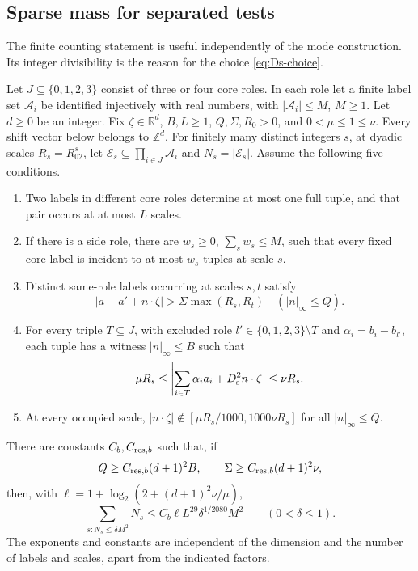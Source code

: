 \subsection{Sparse mass for separated tests}

The finite counting statement is useful independently of the mode
construction.  Its integer divisibility is the reason for the
choice \eqref{eq:Ds-choice}.

\begin{lemma}\label{lem:sparse-b}
Let \(J\subseteq\{0,1,2,3\}\) consist of three or four core roles.
In each role let a finite label set \(\mathcal A_i\) be identified
injectively with real numbers, with \(|\mathcal A_i|\le M\),
\(M\ge1\).  Let \(d\ge0\) be an integer.  Fix
\(\zeta\in\mathbb R^d\), \(B,L\ge1\), \(Q,\Sigma,R_0>0\), and
\(0<\mu\le1\le\nu\).  Every shift vector below belongs to
\(\mathbb Z^d\).  For finitely many distinct integers \(s\), at
dyadic scales \(R_s=R_02^s\), let
\(\mathcal E_s\subseteq\prod_{i\in J}\mathcal A_i\)
and \(N_s=|\mathcal E_s|\).  Assume the following five conditions.
\begin{enumerate}
\item Two labels in different core roles determine at most one full
tuple, and that pair occurs at at most \(L\) scales.
\item If there is a side role, there are \(w_s\ge0\),
\(\sum_s w_s\le M\), such that every fixed core label is incident
to at most \(w_s\) tuples at scale \(s\).
\item Distinct same-role labels occurring at scales \(s,t\) satisfy
\[
 |a-a'+n\cdot\zeta|>\Sigma\max(R_s,R_t)
       \quad(|n|_\infty\le Q).
\]
\item For every triple \(T\subseteq J\), with excluded role
\(l'\in\{0,1,2,3\}\setminus T\) and
\(\alpha_i=b_i-b_{l'}\), each tuple has a witness
\(|n|_\infty\le B\) such that
\[
 \mu R_s\le\left|\sum_{i\in T}\alpha_i a_i
                       +D_{\rm s}^2 n\cdot\zeta\right|\le\nu R_s.
\]
\item At every occupied scale,
\( |n\cdot\zeta|\notin[\mu R_s/1000,1000\nu R_s]\)
for all \(|n|_\infty\le Q\).
\end{enumerate}
There are constants \(C_b,C_{{\rm res},b}\) such that, if
\[
 Q\ge C_{{\rm res},b}(d+1)^2B,\qquad
 \Sigma\ge C_{{\rm res},b}(d+1)^2\nu,
\]
then, with \(\ell=1+\log_2(2+(d+1)^2\nu/\mu)\),
\[
 \sum_{s:N_s\le\delta M^2}N_s
      \le C_b\ell L^{29}\delta^{1/2080}M^2
       \qquad(0<\delta\le1).
\]
The exponents and constants are independent of the dimension and
the number of labels and scales, apart from the indicated factors.
\end{lemma}

